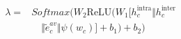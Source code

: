 \begingroup\small{}
\setlength{\jot}{2pt}
\begin{equation}
\label{eq:three-way-gate}
\begin{aligned}
\lambda={}&Softmax\bigl({W}_{2}\mathrm{ReLU}\bigl({W}_{1}\bigl[{h}_{c}^{\mathrm{intra}}\Vert {h}_{c}^{\mathrm{inter}}\\
&{}\quad\Vert{\widetilde{e}}_{c}^{av}\Vert\psi({w}_{c})\bigr]+{b}_{1}\bigr)+{b}_{2}\bigr)
\end{aligned}
\end{equation}
\endgroup
